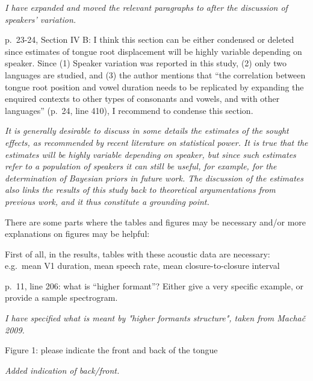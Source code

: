 \documentclass[]{article}
\begin{document}
\begin{adjustwidth}{1cm}{} \textit{
I have expanded and moved the relevant paragraphs to after the discussion of speakers' variation.
} \end{adjustwidth}

p.~23-24, Section IV B: I think this section can be either condensed or
deleted since estimates of tongue root displacement will be highly
variable depending on speaker. Since (1) Speaker variation was reported
in this study, (2) only two languages are studied, and (3) the author
mentions that ``the correlation between tongue root position and vowel
duration needs to be replicated by expanding the enquired contexts to
other types of consonants and vowels, and with other languages'' (p.~24,
line 410), I recommend to condense this section.

\begin{adjustwidth}{1cm}{} \textit{
It is generally desirable to discuss in some details the estimates of the sought effects, as recommended by recent literature on statistical power. It is true that the estimates will be highly variable depending on speaker, but since such estimates refer to a population of speakers it can still be useful, for example, for the determination of Bayesian priors in future work. The discussion of the estimates also links the results of this study back to theoretical argumentations from previous work, and it thus constitute a grounding point.
} \end{adjustwidth}

There are some parts where the tables and figures may be necessary
and/or more explanations on figures may be helpful:

First of all, in the results, tables with these acoustic data are
necessary: e.g.~mean V1 duration, mean speech rate, mean
closure-to-closure interval

p.~11, line 206: what is ``higher formant''? Either give a very specific
example, or provide a sample spectrogram.

\begin{adjustwidth}{1cm}{} \textit{
I have specified what is meant by "higher formants structure", taken from Machač 2009.
} \end{adjustwidth}

Figure 1: please indicate the front and back of the tongue

\begin{adjustwidth}{1cm}{} \textit{
Added indication of back/front.
} \end{adjustwidth}
\end{document}
